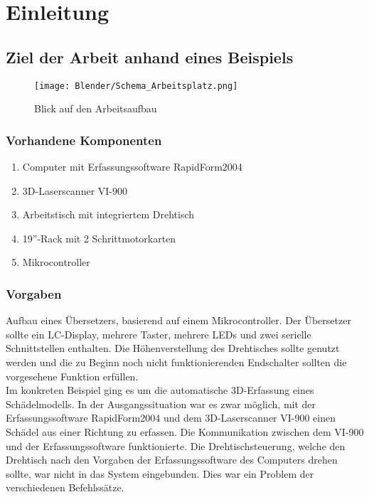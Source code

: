 \chapter{Einleitung}
\label{cha:Einleitung}

\section{Ziel der Arbeit anhand eines Beispiels} 
\label{sec:ZielDerArbeit}
\begin{figure}[htb]
\centering
\texttt{[image: Blender/Schema\_Arbeitsplatz.png]}
\caption{Blick auf den Arbeitsaufbau}
\label{fig:Übersicht}
\end{figure}

\subsection{Vorhandene Komponenten}
\begin{enumerate}
\item Computer mit Erfassungssoftware RapidForm2004
\item 3D-Laserscanner VI-900
\item Arbeitstisch mit integriertem Drehtisch
\item 19''-Rack mit 2 Schrittmotorkarten
\item Mikrocontroller
\end{enumerate}
\subsection{Vorgaben}
Aufbau eines Übersetzers, basierend auf einem Mikrocontroller. Der Übersetzer sollte ein LC-Display, mehrere Taster, mehrere LEDs und zwei serielle Schnittstellen enthalten. Die Höhenverstellung des Drehtisches sollte genutzt werden und die zu Beginn noch nicht funktionierenden Endschalter sollten die vorgesehene Funktion erfüllen.\\ Im konkreten Beispiel ging es um die automatische 3D-Erfassung eines Schädelmodells. In der Ausgangssituation war es zwar möglich, mit der Erfassungssoftware RapidForm2004 und dem 3D-Laserscanner VI-900  einen Schädel aus einer Richtung zu erfassen. Die Kommunikation zwischen dem VI-900 und der Erfassungssoftware funktionierte. Die Drehtischsteuerung, welche den Drehtisch nach den Vorgaben der Erfassungssoftware des Computers drehen sollte, war nicht in das System eingebunden. Dies war ein Problem der verschiedenen Befehlssätze.
